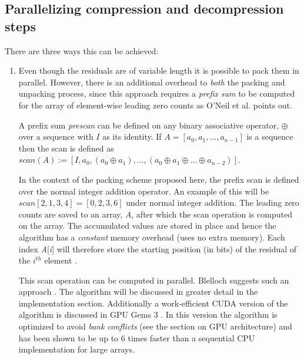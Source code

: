 \subsection{Parallelizing compression and decompression steps}
There are three ways this can be achieved: 
\begin{enumerate}
 \item Even though the residuals are of variable length it is possible to pack them in parallel. However, there is an additional overhead to \textit{both} the packing and 
 unpacking process, since this approach requires a \textit{prefix sum} to be computed for the array of element-wise leading zero counts as O'Neil et al. \cite{O'Neil:2011:FDC:1964179.1964189} 
 points out.
 
 A prefix sum \textit{prescan} can be defined on any binary associative operator, $\oplus$ over a sequence with $I$ as its identity. If $A=[a_{0},a_{1},\dots,a_{n-1}]$ 
 is a sequence then the scan is defined as $scan(A):=[I,a_{0},(a_{0} \oplus a_{1}),\dots,(a_{0} \oplus a_{1} \oplus ... \oplus a_{n-2})]$.
 
 In the context of the packing scheme proposed here, the prefix scan is defined over the normal integer addition operator. An example of this will be $scan[2,1,3,4] = [0,2,3,6]$ 
 under normal integer addition. The leading zero counts are saved to an array, \textit{A}, after which the scan operation is computed on the array. The accumulated values are 
 stored in place and hence the algorithm has a \textit{constant} memory overhead (uses no extra memory). Each index \textit{A}[\textit{i}] will therefore store the starting 
 position (in bits) of the residual of the $i^{th}$ element \cite{blelloch1990prefix}. 

 This scan operation can be computed in parallel. Blelloch suggests such an approach \cite{blelloch1990prefix}. The algorithm will be discussed in greater detail in the 
 implementation section. Additionally a work-efficient CUDA version of the algorithm is discussed in GPU Gems 3 \cite{harris2007parallel}. In this version the algorithm is 
 optimized to avoid \textit{bank conflicts} (see the section on GPU architecture) and has been shown to be up to 6 times faster than a sequential CPU implementation for large 
 arrays.
 

\end{enumerate}
